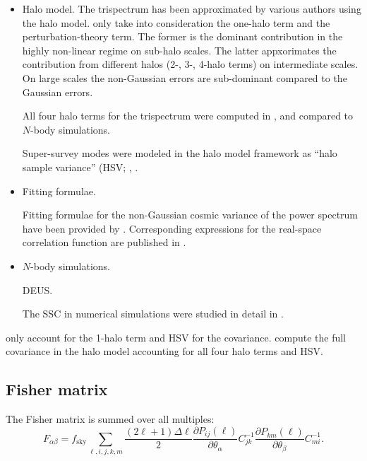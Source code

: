 \begin{itemize}

\item Halo model. The trispectrum has been approximated by various authors
using the halo model. \cite{2009MNRAS.395.2065T} only take into consideration
the one-halo term and the perturbation-theory term. The former is the dominant
contribution in the highly non-linear regime on sub-halo scales. The latter
appxorimates the contribution from different halos (2-, 3-, 4-halo terms) on
intermediate scales. On large scales the non-Gaussian errors are sub-dominant
compared to the Gaussian errors.

All four halo terms for the trispectrum were computed in
\cite{2001ApJ...554...56C}, and compared to $N$-body simulations.

Super-survey modes were modeled in the halo model framework as ``halo sample
variance'' (HSV; \cite{2009ApJ...701..945S}, \cite{2013MNRAS.429..344K}.


\item Fitting formulae.

Fitting formulae for the non-Gaussian cosmic variance of the power spectrum have been provided
by \cite{2010A&A...514A..79P}. Corresponding expressions for the real-space correlation function
are published in \cite{2011ApJ...734...76S}.

\item $N$-body simulations.

DEUS.

The SSC in numerical simulations were studied in detail 
in \cite{2014PhRvD..89h3519L}.



\end{itemize}

\cite{2013MNRAS.429..344K} only account for the 1-halo term and HSV for the
covariance. \cite{2013arXiv1302.2401E} compute the full covariance in the halo
model accounting for all four halo terms and HSV.



\subsection{Fisher matrix}

The Fisher matrix is summed over all multiples:
%
\begin{equation}
F_{\alpha\beta}=f_{\mathrm{sky}}\sum\limits _{\ell,i,j,k,m}\frac{(2\ell+1)\Delta\ell}{2}\frac{\partial P_{ij}(\ell)}{\partial\theta_{\alpha}}C_{jk}^{-1}\frac{\partial P_{km}(\ell)}{\partial\theta_{\beta}}C_{mi}^{-1}\label{eq:fm-wl}.
\end{equation}

